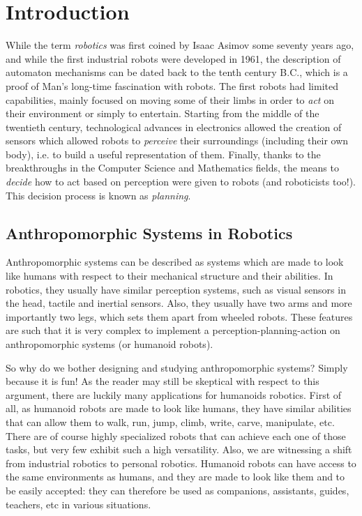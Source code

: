 \chapter{Introduction} 
\label{chap:chap0}

While the term \emph{robotics} was first coined by Isaac Asimov some
seventy years ago, and while the first industrial robots were
developed in 1961, the description of automaton mechanisms can
be dated back to the tenth century B.C., which is a proof of Man's
long-time fascination with robots. The first robots had limited
capabilities, mainly focused on moving some of their limbs in order to
\emph{act} on their environment or simply to entertain. Starting from
the middle of the twentieth century, technological advances in
electronics allowed the creation of sensors which allowed robots to
\emph{perceive} their surroundings (including their own body), i.e. to
build a useful representation of them. Finally, thanks to the
breakthroughs in the Computer Science and Mathematics fields, the
means to \emph{decide} how to act based on perception were given to
robots (and roboticists too!). This decision process is known as
\emph{planning}.

\section*{Anthropomorphic Systems in Robotics}

Anthropomorphic systems can be described as systems which are made to
look like humans with respect to their mechanical structure and their
abilities. In robotics, they usually have similar perception systems,
such as visual sensors in the head, tactile and inertial
sensors. Also, they usually have two arms and more importantly two
legs, which sets them apart from wheeled robots. These features are
such that it is very complex to implement a perception-planning-action
on anthropomorphic systems (or humanoid robots).

So why do we bother designing and studying anthropomorphic systems?
Simply because it is fun! As the reader may still be skeptical with
respect to this argument, there are luckily many applications for
humanoids robotics. First of all, as humanoid robots are made to look
like humans, they have similar abilities that can allow them to walk,
run, jump, climb, write, carve, manipulate, etc. There are of course
highly specialized robots that can achieve each one of those tasks,
but very few exhibit such a high versatility. Also, we are witnessing
a shift from industrial robotics to personal robotics. Humanoid robots
can have access to the same environments as humans, and they are made
to look like them and to be easily accepted: they can therefore be
used as companions, assistants, guides, teachers, etc in various
situations.

